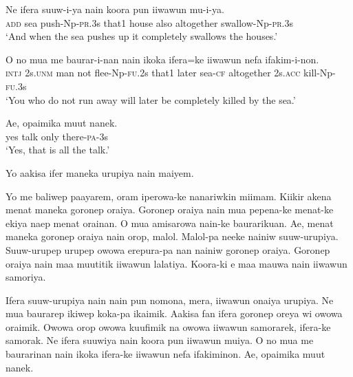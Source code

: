 \ea
\gll  Ne  ifera  suuw-i-ya  nain  koora  pun  iiwawun  mu-i-ya. \\
\textsc{add}  sea  push-Np-\textsc{pr}.3s  that1  house  also  altogether  swallow-Np-\textsc{pr}.3s \\
\glt ‘And when the sea pushes up it completely swallows the houses.’ \\
\z


\ea
\gll  O  no  mua  me  baurar-i-nan  nain  ikoka  ifera=ke  iiwawun      nefa  ifakim-i-non. \\
\textsc{intj}  2s.\textsc{unm}  man  not  flee-Np-\textsc{fu}.2s  that1  later  sea-\textsc{cf}  altogether 2s.\textsc{acc}  kill-Np-\textsc{fu}.3s \\


\glt ‘You who do not run away will later be completely killed by the sea.’ \\
\z


\ea
\gll  Ae,  opaimika  muut  nanek. \\
yes  talk  only  there-\textsc{pa}-3s \\
\glt ‘Yes, that is all the talk.’ \\
\z

Yo aakisa ifer maneka urupiya nain maiyem.

Yo me baliwep paayarem, oram iperowa-ke nanariwkin miimam. 
Kiikir akena menat maneka goronep oraiya. 
Goronep oraiya nain mua pepena-ke menat-ke ekiya naep menat orainan. 
O mua amisarowa nain-ke baurarikuan. 
Ae, menat maneka goronep oraiya nain orop, malol. 
Malol-pa neeke nainiw suuw-urupiya. 
Suuw-urupep urupep owowa erepura-pa nan nainiw goronep oraiya.
Goronep oraiya nain maa muutitik iiwawun lalatiya. 
Koora-ki e maa mauwa nain iiwawun samoriya.

Ifera suuw-urupiya nain nain pun nomona, mera, iiwawun onaiya urupiya.
Ne mua baurarep  ikiwep  koka-pa ikaimik. 
Aakisa fan ifera goronep oreya  wi owowa oraimik. 
Owowa orop owowa kuufimik na owowa iiwawun samorarek, ifera-ke samorak. 
Ne ifera suuwiya nain koora pun iiwawun muiya. 
O no mua me baurarinan nain ikoka ifera-ke iiwawun nefa ifakiminon. 
\textrm{Ae, opaimika muut nanek.}